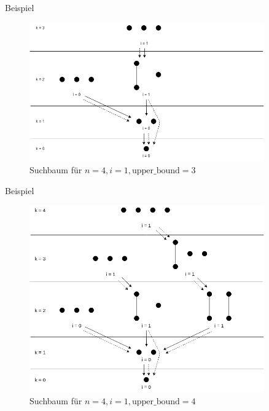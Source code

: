 \begin{frame}{Beispiel}

  \begin{figure}[!b]
    \centering
    \includegraphics[width=0.9\textwidth,height=0.67\textheight,keepaspectratio]{./figures/backward-searchtree-bound3.png}
    \caption{Suchbaum für $n=4,i=1,\text{upper\_bound}=3$}
    \label{fig:backward-searchtree-bound3}
  \end{figure}
\end{frame}

\begin{frame}{Beispiel}
  \begin{figure}[!b]
    \centering
    \includegraphics[width=0.9\textwidth,height=0.67\textheight,keepaspectratio]{./figures/backward-searchtree-bound4.png}
    \caption{Suchbaum für $n=4,i=1,\text{upper\_bound}=4$}
    \label{fig:backward-searchtree-bound4}
  \end{figure}
\end{frame}

